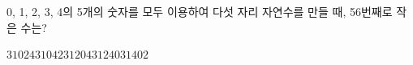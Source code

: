 0, 1, 2, 3, 4의 5개의 숫자를 모두 이용하여 다섯 자리 자연수를 만들 때, 56번째로 작은 수는?
\begin{choices32}{$31024$}{$31042$}{$31204$}{$31240$}{$31402$}\end{choices32}
